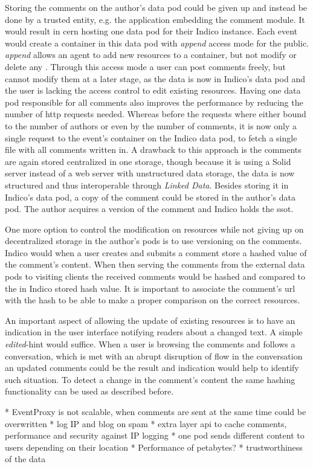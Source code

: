 Storing the comments on the author's data pod could be given up and instead be done by a trusted entity, e.g. the application embedding the comment module. It would result in \gls{cern} hosting one data pod for their Indico instance. Each event would create a container in this data pod with \textit{append} access mode for the public. \textit{append} allows an agent to add new resources to a container, but not modify or delete any \cite{solid-protocol}. Through this access mode a user can post comments freely, but cannot modify them at a later stage, as the data is now in Indico's data pod and the user is lacking the access control to edit existing resources. Having one data pod responsible for all comments also improves the performance by reducing the number of \gls{http} requests needed. Whereas before the requests where either bound to the number of authors or even by the number of comments, it is now only a single request to the event's container on the Indico data pod, to fetch a single file with all comments written in. A drawback to this approach is the comments are again stored centralized in one storage, though because it is using a Solid server instead of a web server with unstructured data storage, the data is now structured and thus interoperable through \textit{Linked Data}. Besides storing it in Indico's data pod, a copy of the comment could be stored in the author's data pod. The author acquires a version of the comment and Indico holds the \gls{ssot}.

One more option to control the modification on resources while not giving up on decentralized storage in the author's pods is to use versioning on the comments. Indico would when a user creates and submits a comment store a hashed value of the comment's content. When then serving the comments from the external data pods to visiting clients the received comments would be hashed and compared to the in Indico stored hash value. It is important to associate the comment's \gls{url} with the hash to be able to make a proper comparison on the correct resources.

An important aspect of allowing the update of existing resources is to have an indication in the user interface notifying readers about a changed text. A simple \textit{edited}-hint would suffice. When a user is browsing the comments and follows a conversation, which is met with an abrupt disruption of flow in the conversation an updated comments could be the result and indication would help to identify such situation.  To detect a change in the comment's content the same hashing functionality can be used as described before.



* EventProxy is not scalable, when comments are sent at the same time could be overwritten
* log IP and blog on spam
* extra layer api to cache comments, performance and security against IP logging
* one pod sends different content to users depending on their location
* Performance of petabytes?
* trustworthiness of the data